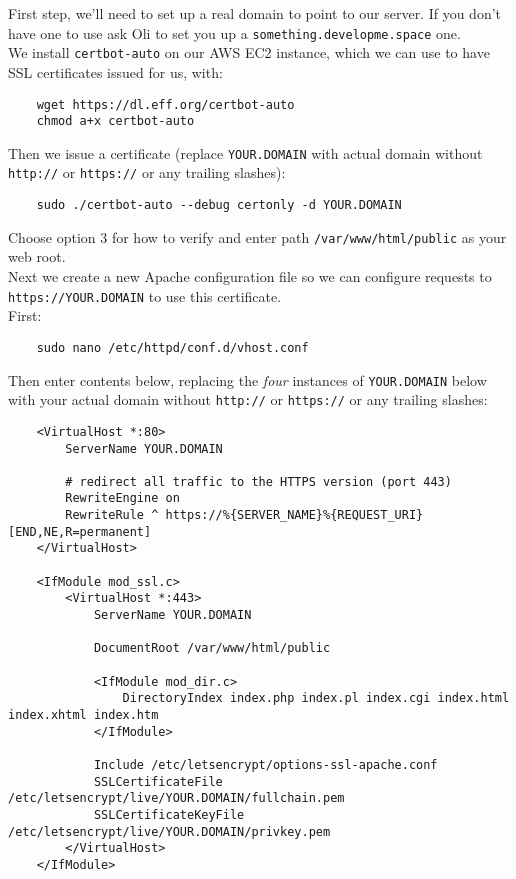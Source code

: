 First step, we'll need to set up a real domain to point to our server. If you don't have one to use ask Oli to set you up a \texttt{something.developme.space} one.
\\

We install \texttt{certbot-auto} on our AWS EC2 instance, which we can use to have SSL certificates issued for us, with:

\begin{verbatim}
    wget https://dl.eff.org/certbot-auto
    chmod a+x certbot-auto
\end{verbatim}

Then we issue a certificate (replace \texttt{YOUR.DOMAIN} with actual domain without \texttt{http://} or \texttt{https://} or any trailing slashes):

\begin{verbatim}
    sudo ./certbot-auto --debug certonly -d YOUR.DOMAIN
\end{verbatim}

Choose option 3 for how to verify and enter path \texttt{/var/www/html/public} as your web root.
\\

Next we create a new Apache configuration file so we can configure requests to \texttt{https://YOUR.DOMAIN} to use this certificate.
\\

First:

\begin{verbatim}
    sudo nano /etc/httpd/conf.d/vhost.conf
\end{verbatim}

Then enter contents below, replacing the \textit{four} instances of \texttt{YOUR.DOMAIN} below with your actual domain without \texttt{http://} or \texttt{https://} or any trailing slashes:

\begin{verbatim}
    <VirtualHost *:80>
        ServerName YOUR.DOMAIN

        # redirect all traffic to the HTTPS version (port 443)
        RewriteEngine on
        RewriteRule ^ https://%{SERVER_NAME}%{REQUEST_URI} [END,NE,R=permanent]
    </VirtualHost>

    <IfModule mod_ssl.c>
        <VirtualHost *:443>
            ServerName YOUR.DOMAIN

            DocumentRoot /var/www/html/public

            <IfModule mod_dir.c>
                DirectoryIndex index.php index.pl index.cgi index.html index.xhtml index.htm
            </IfModule>

            Include /etc/letsencrypt/options-ssl-apache.conf
            SSLCertificateFile /etc/letsencrypt/live/YOUR.DOMAIN/fullchain.pem
            SSLCertificateKeyFile /etc/letsencrypt/live/YOUR.DOMAIN/privkey.pem
        </VirtualHost>
    </IfModule>
\end{verbatim}

